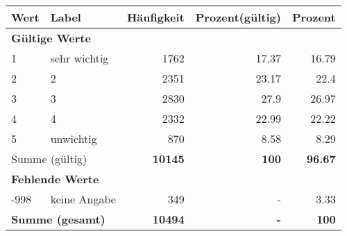      \begin{longtable}{lXrrr}
     \toprule
     \textbf{Wert} & \textbf{Label} & \textbf{Häufigkeit} & \textbf{Prozent(gültig)} & \textbf{Prozent} \\
     \endhead
     \midrule
     \multicolumn{5}{l}{\textbf{Gültige Werte}}\\

     1 &
     \multicolumn{1}{X}{ sehr wichtig   } &


       \num{1762} &
       \num[round-mode=places,round-precision=2]{17,37} &
         \num[round-mode=places,round-precision=2]{16,79} \\

     2 &
     \multicolumn{1}{X}{ 2   } &


       \num{2351} &
       \num[round-mode=places,round-precision=2]{23,17} &
         \num[round-mode=places,round-precision=2]{22,4} \\

     3 &
     \multicolumn{1}{X}{ 3   } &


       \num{2830} &
       \num[round-mode=places,round-precision=2]{27,9} &
         \num[round-mode=places,round-precision=2]{26,97} \\

     4 &
     \multicolumn{1}{X}{ 4   } &


       \num{2332} &
       \num[round-mode=places,round-precision=2]{22,99} &
         \num[round-mode=places,round-precision=2]{22,22} \\

     5 &
     \multicolumn{1}{X}{ unwichtig   } &


       \num{870} &
       \num[round-mode=places,round-precision=2]{8,58} &
         \num[round-mode=places,round-precision=2]{8,29} \\
     \midrule
     \multicolumn{2}{l}{Summe (gültig)} &
       \textbf{\num{10145}} &
     \textbf{100} &
       \textbf{\num[round-mode=places,round-precision=2]{96,67}} \\
     \multicolumn{5}{l}{\textbf{Fehlende Werte}}\\
       -998 &
       keine Angabe &
         \num{349} &
        - &
         \num[round-mode=places,round-precision=2]{3,33} \\
     \midrule
     \multicolumn{2}{l}{\textbf{Summe (gesamt)}} &
          \textbf{\num{10494}} &
        \textbf{-} &
        \textbf{100} \\
     \bottomrule
     \end{longtable}
     
